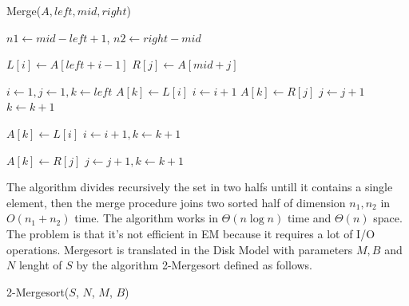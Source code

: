 \documentclass{report}
\begin{document}
\begin{algorithm}[H]
    \caption{Merge(\(A, left, mid, right\))}
    \begin{algorithmic}[1]
    \State \(n1 \gets mid - left + 1\), \(n2 \gets right - mid\)
    
        \State \(L[i] \gets A[left + i - 1]\)
    \EndFor
        \State \(R[j] \gets A[mid + j]\)
    \EndFor
    
    \State \(i \gets 1, j \gets 1, k \gets left\)
            \State \(A[k] \gets L[i]\)
            \State \(i \gets i + 1\)
        \Else
            \State \(A[k] \gets R[j]\)
            \State \(j \gets j + 1\)
        \EndIf
        \State \(k \gets k + 1\)
    \EndWhile
    
        \State \(A[k] \gets L[i]\)
        \State \(i \gets i + 1, k \gets k + 1\)
    \EndWhile
    
        \State \(A[k] \gets R[j]\)
        \State \(j \gets j + 1, k \gets k + 1\)
    \EndWhile
    \end{algorithmic}
\end{algorithm}
\noindent
The algorithm divides recursively the set in two halfs untill it contains a single element, then the merge procedure joins two sorted half of dimension \(n_1,n_2\) in \(O(n_1 + n_2)\) time. The algorithm works in \(\Theta(n \log n)\) time and \(\Theta(n)\) space. The problem is that it's not efficient in EM because it requires a lot of I/O operations. Mergesort is translated in the Disk Model with parameters \(M, B\) and \(N\) lenght of \(S\) by the algorithm 2-Mergesort defined as follows.   
\begin{algorithm}[H]
    \caption{2-Mergesort(\(S\), \(N\), \(M\), \(B\))}
    \begin{algorithmic}[1]
    \Else{}
    \EndIf{}
    \end{algorithmic}
\end{algorithm}
\end{document}
